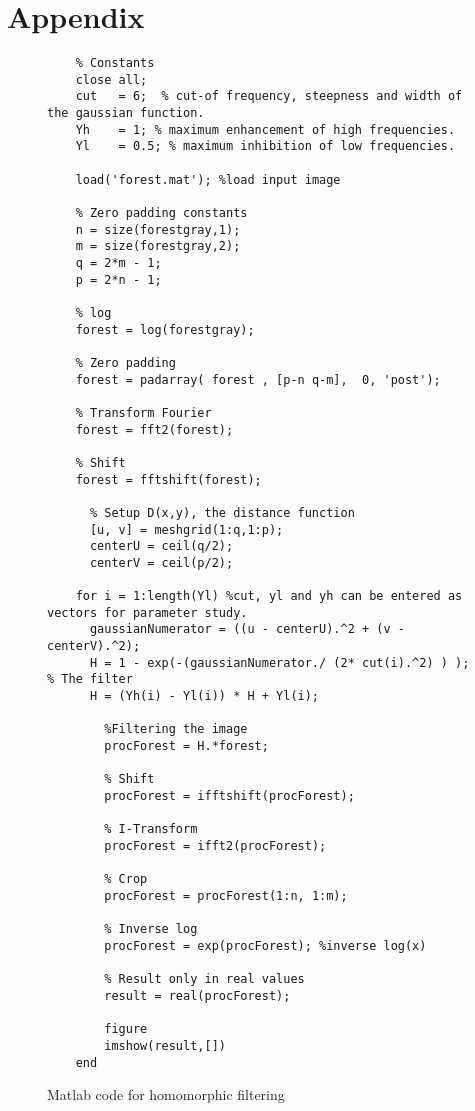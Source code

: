 \section{Appendix}
\begin{figure}[h!]
  \begin{lstlisting}
    % Constants
    close all;
    cut   = 6;  % cut-of frequency, steepness and width of the gaussian function.
    Yh    = 1; % maximum enhancement of high frequencies.
    Yl    = 0.5; % maximum inhibition of low frequencies.

    load('forest.mat'); %load input image

    % Zero padding constants
    n = size(forestgray,1);
    m = size(forestgray,2);
    q = 2*m - 1;
    p = 2*n - 1; 

    % log
    forest = log(forestgray);

    % Zero padding
    forest = padarray( forest , [p-n q-m],  0, 'post');   

    % Transform Fourier
    forest = fft2(forest);                                

    % Shift
    forest = fftshift(forest);                            
      
      % Setup D(x,y), the distance function
      [u, v] = meshgrid(1:q,1:p);
      centerU = ceil(q/2);
      centerV = ceil(p/2);

    for i = 1:length(Yl) %cut, yl and yh can be entered as vectors for parameter study.
      gaussianNumerator = ((u - centerU).^2 + (v - centerV).^2);
      H = 1 - exp(-(gaussianNumerator./ (2* cut(i).^2) ) ); % The filter
      H = (Yh(i) - Yl(i)) * H + Yl(i);
      
        %Filtering the image
        procForest = H.*forest;

        % Shift
        procForest = ifftshift(procForest);

        % I-Transform
        procForest = ifft2(procForest);

        % Crop
        procForest = procForest(1:n, 1:m);

        % Inverse log
        procForest = exp(procForest); %inverse log(x)

        % Result only in real values
        result = real(procForest);

        figure
        imshow(result,[])
    end
  \end{lstlisting}
  \label{code:main}
  \caption{Matlab code for homomorphic filtering}
\end{figure}